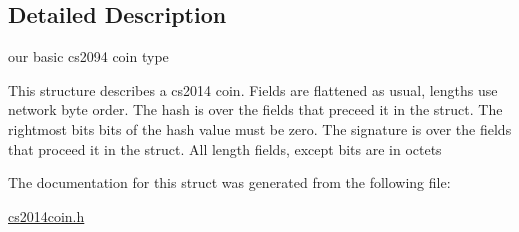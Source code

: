 \subsection{Detailed Description}
our basic cs2094 coin type 

This structure describes a cs2014 coin. Fields are flattened as usual, lengths use network byte order. The hash is over the fields that preceed it in the struct. The rightmost \textquotesingle{}bits\textquotesingle{} bits of the hash value must be zero. The signature is over the fields that proceed it in the struct. All length fields, except \textquotesingle{}bits\textquotesingle{} are in octets 

The documentation for this struct was generated from the following file\+:\begin{DoxyCompactItemize}
\item 
\hyperlink{cs2014coin_8h}{cs2014coin.\+h}\end{DoxyCompactItemize}
